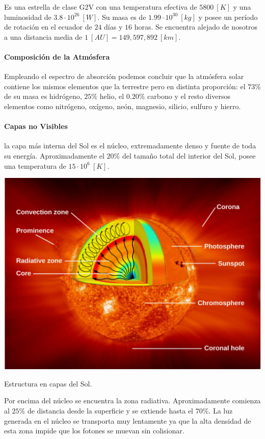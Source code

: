 \documentclass{tufte-handout}
\begin{document}
Es una estrella de clase G2V con una temperatura efectiva de $5800~[K]$ y una luminosidad de $3.8\cdot 10^{26}~[W]$. Su masa es de $1.99 \cdot 10^{30}~[kg]$ y posee un período de rotación en el ecuador de $24$ días y $16$ horas. Se encuentra alejado de nosotros a una distancia media de $1~[AU] = 149,597,892~[km]$.

\paragraph{Composición de la Atmósfera}

Empleando el espectro de absorción podemos concluir que la atmósfera solar contiene los mismos elementos que la terrestre pero en distinta proporción: el $73\%$ de su masa es hidrógeno, $25\%$ helio, el $0.20\%$ carbono y el resto diversos elementos como nitrógeno, oxígeno, neón, magnesio, silicio, sulfuro y hierro.

\paragraph{Capas no Visibles} la capa más interna del Sol es el núcleo, extremadamente denso y fuente de toda su energía. Aproximadamente el $20\%$ del tamaño total del interior del Sol, posee una temperatura de $15\cdot 10^6~[K]$.

\begin{marginfigure}
  \includegraphics[width=\linewidth]{img/sun}
  \caption{Estructura en capas del Sol.}
\end{marginfigure}

Por encima del núcleo se encuentra la zona radiativa. Aproximadamente comienza al $25\%$ de distancia desde la superficie y se extiende hasta el $70\%$. La luz generada en el núcleo se transporta muy lentamente ya que la alta densidad de esta zona impide que los fotones se muevan sin colisionar.
\end{document}
